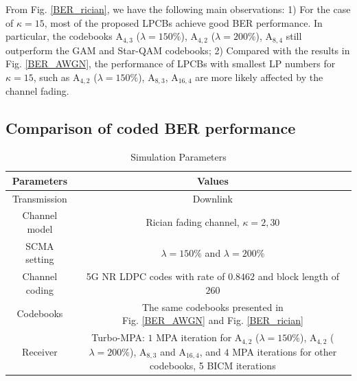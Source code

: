 \documentclass[journal]{IEEEtran}
\begin{document}
From Fig. \ref{BER_rician},   we have the following main observations: 1) For the case of $\kappa  = 15$, most of the proposed  LPCBs   achieve good BER performance. In particular, the codebooks $\text{A}_{4,3}$ ($\lambda =150\%$), $\text{A}_{4,2}$ ($\lambda =200\%$), $\text{A}_{8,4}$ still outperform the GAM and Star-QAM codebooks;  2) Compared with the results in  Fig. \ref{BER_AWGN}, the performance of  LPCBs with smallest LP numbers for  $\kappa  = 15$, such as $\text{A}_{4,2}$ ($\lambda =150 \%$),  $\text{A}_{8,3}$, $\text{A}_{16,4}$  are more likely affected  by the channel fading.



\subsection{Comparison of coded BER performance}

 \begin{table}  
\small
    \caption{Simulation Parameters}
    \centering
    \begin{tabular}{c|c}
    \hline
     \hline
       \textbf{ Parameters}  &  \textbf{ Values}  \\
        \hline
         \hline
       Transmission  &  Downlink \\
        \hline
       Channel model  &  Rician fading channel, $\kappa =2, 30$ \\
        \hline
        SCMA setting & $\lambda = 150\%$ and $\lambda = 200\%$ \\
          \hline
        Channel coding &  \makecell[c] {5G NR LDPC codes with \\ rate  of $0.8462$ and block length of $260$ }  \\ 
         \hline
        Codebooks &  \makecell[c] {The same codebooks presented in  \\ Fig. \ref{BER_AWGN} and Fig. \ref{BER_rician} }  \\ 
       \hline
       Receiver &   \makecell[c] { Turbo-MPA: \\ $1$ MPA iteration  for  $\text{A}_{4,2}$ ($\lambda = 150\%$), \\ $\text{A}_{4,2}$ ($\lambda = 200\%$), $\text{A}_{8,3}$ and $\text{A}_{16,4}$, \\and $4$ MPA iterations for other codebooks, \\ 5 BICM iterations } \\
         \hline
    \end{tabular}
    \label{sim_para}
    \vspace{-1.5em}
\end{table}
 
\end{document}
